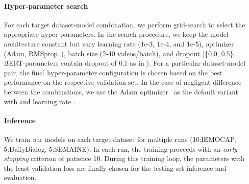 \documentclass[preprint,3pt]{elsarticle}
\begin{document}
\paragraph{Hyper-parameter search} For each target dataset-model combination, we perform grid-search to select the appropriate hyper-parameters. In the search procedure, we keep the model architecture constant but vary learning rate (1e-3, 1e-4, and 1e-5), optimizer (Adam, RMSprop~\cite{Tieleman2012}), batch size (2-40 videos/batch), and dropout (\{0.0, 0.5\}. BERT-parameters contain dropout of 0.1 as in \citet{devlin2018bert}). For a particular dataset-model pair, the final hyper-parameter configuration is chosen based on the best performance on the respective validation set. In the case of negligent difference between the combinations, we use the Adam optimizer~\cite{kingma2014adam} as the default variant with  and learning rate .

\paragraph{Inference} 
We train our models on each target dataset for multiple runs (10:IEMOCAP, 5:DailyDialog, 5:SEMAINE). In each run,
the training proceeds with an \textit{early stopping} criterion of patience 10. During this training loop, the parameters with the least validation loss are finally chosen for the testing-set inference and evaluation.
\end{document}
